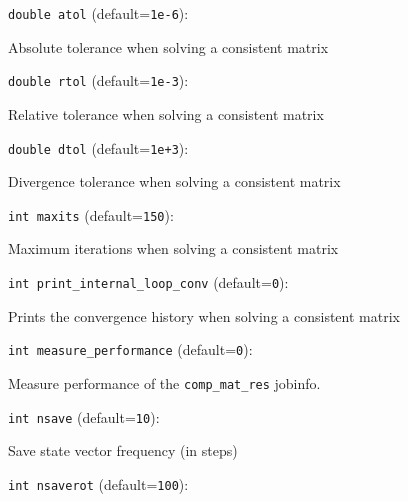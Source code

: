 \item\verb+double atol+ {\rm(default=\verb|1e-6|)}:

Absolute tolerance when solving a consistent matrix

\item\verb+double rtol+ {\rm(default=\verb|1e-3|)}:

Relative tolerance when solving a consistent matrix

\item\verb+double dtol+ {\rm(default=\verb|1e+3|)}:

Divergence tolerance when solving a consistent matrix

\item\verb+int maxits+ {\rm(default=\verb|150|)}:

Maximum iterations when solving a consistent matrix

\item\verb+int print_internal_loop_conv+ {\rm(default=\verb|0|)}:

Prints the convergence history when solving a consistent matrix

\item\verb+int measure_performance+ {\rm(default=\verb|0|)}:

Measure performance of the \verb+comp_mat_res+ jobinfo. 

\item\verb+int nsave+ {\rm(default=\verb|10|)}:

Save state vector frequency (in steps)

\item\verb+int nsaverot+ {\rm(default=\verb|100|)}:

